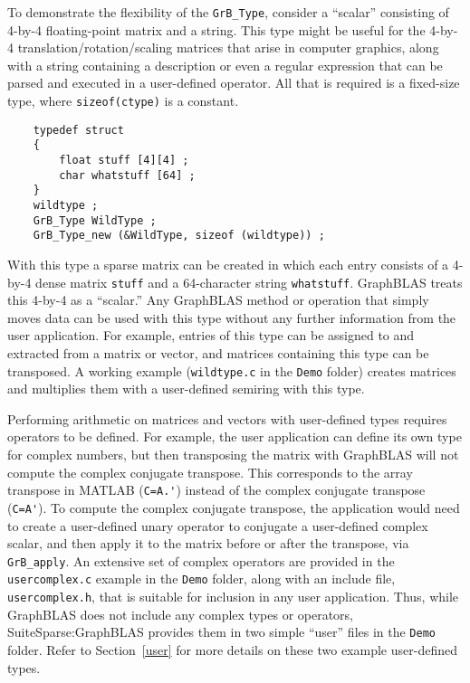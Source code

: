 \documentclass[12pt]{article}
\begin{document}
To demonstrate the flexibility of the \verb'GrB_Type', consider a ``scalar''
consisting of 4-by-4 floating-point matrix and a string.  This type might be
useful for the 4-by-4 translation/rotation/scaling matrices that arise in
computer graphics, along with a string containing a description or even a
regular expression that can be parsed and executed in a user-defined operator.
All that is required is a fixed-size type, where \verb'sizeof(ctype)' is
a constant.

    {\footnotesize
    \begin{verbatim}
    typedef struct
    {
        float stuff [4][4] ;
        char whatstuff [64] ;
    }
    wildtype ;
    GrB_Type WildType ;
    GrB_Type_new (&WildType, sizeof (wildtype)) ; \end{verbatim} }

With this type a sparse matrix can be created in which each entry consists of a
4-by-4 dense matrix \verb'stuff' and a 64-character string \verb'whatstuff'.
GraphBLAS treats this 4-by-4 as a ``scalar.'' Any GraphBLAS method or operation
that simply moves data can be used with this type without any further
information from the user application.  For example, entries of this type can
be assigned to and extracted from a matrix or vector, and matrices containing
this type can be transposed.  A working example (\verb'wildtype.c'
in the \verb'Demo' folder) creates matrices and multiplies them with
a user-defined semiring with this type.

Performing arithmetic on matrices and vectors with user-defined types requires
operators to be defined.  For example, the user application can define its own
type for complex numbers, but then transposing the matrix with GraphBLAS will
not compute the complex conjugate transpose.  This corresponds to the array
transpose in MATLAB (\verb"C=A.'") instead of the complex conjugate transpose
(\verb"C=A'").  To compute the complex conjugate transpose, the application
would need to create a user-defined unary operator to conjugate a user-defined
complex scalar, and then apply it to the matrix before or after the transpose,
via \verb'GrB_apply'.  An extensive set of complex operators are provided in
the \verb'usercomplex.c' example in the \verb'Demo' folder, along with an
include file, \verb'usercomplex.h', that is suitable for inclusion in any user
application.  Thus, while GraphBLAS does not include any complex types or
operators, SuiteSparse:GraphBLAS provides them in two simple ``user'' files in
the \verb'Demo' folder.
Refer to Section~\ref{user} for more details on these two example user-defined
types.
\end{document}
